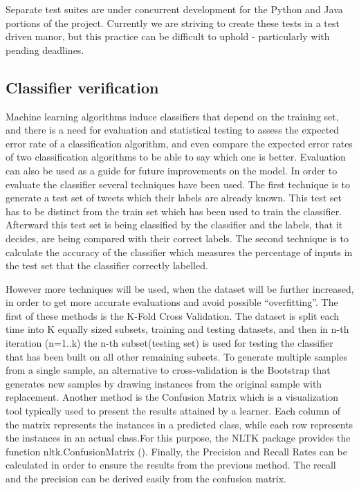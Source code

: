 Separate test suites are under concurrent development for the Python and Java
portions of the project. Currently we are striving to create these tests in a
test driven manor, but this practice can be difficult to uphold - particularly
with pending deadlines.

\subsection{Classifier verification}
Machine learning algorithms induce classifiers that depend on the training set, and there is a need for evaluation and statistical testing to assess the expected error rate of a classification algorithm, and even compare the expected error rates of two classification algorithms to be able to say which one is better. Evaluation can also be used as a guide for future improvements on the model. In order to evaluate the classifier several techniques have been used. The first technique is to generate a test set of tweets which their labels are already known. This test set has to be distinct from the train set which has been used to train the classifier. Afterward this test set is being classified by the classifier and the labels, that it decides, are being compared with their correct labels. The second technique is to calculate the accuracy of the classifier which measures the percentage of inputs in the test set that the classifier correctly labelled.

However more techniques will be used, when the dataset will be further increased, in order to get more accurate evaluations and avoid possible “overfitting”. The first of these methods is the K-Fold Cross Validation. The dataset is split each time into K equally sized subsets, training and testing datasets, and then in n-th iteration (n=1..k) the n-th subset(testing set) is used for testing the classifier that has been built on all other remaining subsets. To generate multiple samples from a single sample, an alternative to cross-validation is the Bootstrap that generates new samples by drawing instances from the original sample with replacement. Another method is the Confusion Matrix which is a visualization tool typically used to present the results attained by a learner. Each column of the matrix represents the instances in a predicted class, while each row represents the instances in an actual class.For this purpose, the NLTK package provides the function nltk.ConfusionMatrix (). Finally, the Precision and Recall Rates can be calculated in order to ensure the results from the previous method. The recall and the precision can be derived easily from the confusion matrix.

